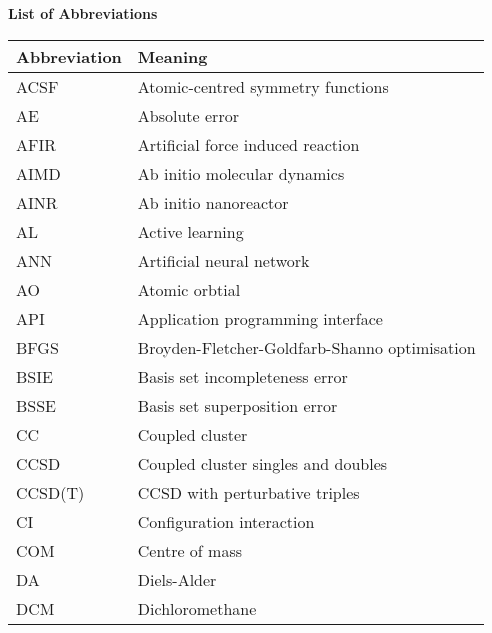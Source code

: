 \documentclass[main.tex]{subfiles}
\begin{document}
\begin{center}
		{\bfseries\Large \textsf{List of Abbreviations}}
\end{center}
\begin{table}[h!]
\def\arraystretch{2.0}
\begin{tabularx}{\textwidth}{YY}
Abbreviation & Meaning \\
\hline
ACSF	&	Atomic-centred symmetry functions	\\
AE	&	Absolute error	\\
AFIR	&	Artificial force induced reaction	\\
AIMD	&	Ab initio molecular dynamics	\\
AINR	&	Ab initio nanoreactor	\\
AL	&	Active learning	\\
ANN	&	Artificial neural network	\\
AO	&	Atomic orbtial	\\
API	&	Application programming interface	\\
BFGS	&	Broyden-Fletcher-Goldfarb-Shanno optimisation	\\
BSIE	&	Basis set incompleteness error	\\
BSSE	&	Basis set superposition error	\\
CC	&	Coupled cluster	\\
CCSD	&	Coupled cluster singles and doubles	\\
CCSD(T)	&	CCSD with perturbative triples	\\
CI	&	Configuration interaction	\\
COM	&	Centre of mass	\\
DA	&	Diels-Alder	\\
DCM	&	Dichloromethane	\\
\end{tabularx}
\end{table}
\newpage
\end{document}
